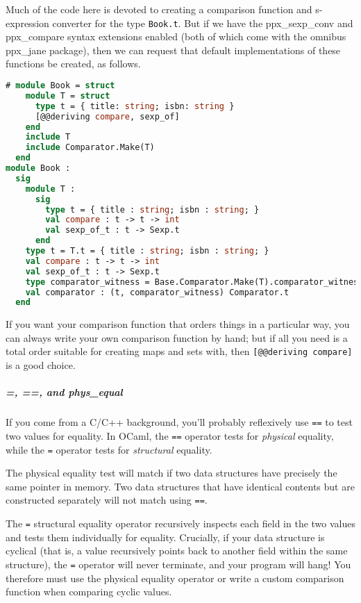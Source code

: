 Much of the code here is devoted to creating a comparison function and
s-expression converter for the type \passthrough{\lstinline!Book.t!}.
But if we have the ppx\_sexp\_conv and ppx\_compare syntax extensions
enabled (both of which come with the omnibus ppx\_jane package), then we
can request that default implementations of these functions be created,
as follows.

\begin{lstlisting}[language=Caml]
# module Book = struct
    module T = struct
      type t = { title: string; isbn: string }
      [@@deriving compare, sexp_of]
    end
    include T
    include Comparator.Make(T)
  end
module Book :
  sig
    module T :
      sig
        type t = { title : string; isbn : string; }
        val compare : t -> t -> int
        val sexp_of_t : t -> Sexp.t
      end
    type t = T.t = { title : string; isbn : string; }
    val compare : t -> t -> int
    val sexp_of_t : t -> Sexp.t
    type comparator_witness = Base.Comparator.Make(T).comparator_witness
    val comparator : (t, comparator_witness) Comparator.t
  end
\end{lstlisting}

If you want your comparison function that orders things in a particular
way, you can always write your own comparison function by hand; but if
all you need is a total order suitable for creating maps and sets with,
then \passthrough{\lstinline![@@deriving compare]!} is a good choice.

\hypertarget{and-phys_equal}{%
\subparagraph{=, ==, and phys\_equal}\label{and-phys_equal}}

If you come from a C/C++ background, you'll probably reflexively use
\passthrough{\lstinline!==!} to test two values for equality. In OCaml,
the \passthrough{\lstinline!==!} operator tests for \emph{physical}
equality, while the \passthrough{\lstinline!=!} operator tests for
\emph{structural} equality.

The physical equality test will match if two data structures have
precisely the same pointer in memory. Two data structures that have
identical contents but are constructed separately will not match using
\passthrough{\lstinline!==!}.

The \passthrough{\lstinline!=!} structural equality operator recursively
inspects each field in the two values and tests them individually for
equality. Crucially, if your data structure is cyclical (that is, a
value recursively points back to another field within the same
structure), the \passthrough{\lstinline!=!} operator will never
terminate, and your program will hang! You therefore must use the
physical equality operator or write a custom comparison function when
comparing cyclic values.


